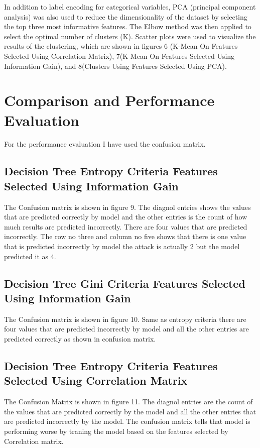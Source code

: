 \documentclass{article}
\begin{document}
In addition to label encoding for categorical variables, PCA (principal component analysis) was also used to reduce the dimensionality of the dataset by selecting the top three most informative features. The Elbow method was then applied to select the optimal number of clusters (K). Scatter plots were used to visualize the results of the clustering, which are shown in figures 6 (K-Mean On Features Selected Using Correlation Matrix), 7(K-Mean On Features Selected Using Information Gain), and 8(Clusters Using Features Selected Using PCA).



\section{Comparison and Performance Evaluation}
For the performance evaluation I have used the confusion matrix.

\subsection{Decision Tree Entropy Criteria Features Selected Using Information Gain}
The Confusion matrix is shown in figure 9. The diagnol entries shows the values that are predicted correctly by model and the other entries is the count of how much results are predicted incorrectly. There are four values that are predicted incorrectly. The row no three and column no five shows that there is one value that is predicted incorrectly by model the attack is actually 2 but the model predicted it as 4. 

\subsection{Decision Tree Gini Criteria Features Selected Using Information Gain}
The Confusion matrix is shown in figure 10. Same as entropy criteria there are four values that are predicted incorrectly by model and all the other entries are predicted correctly as shown in confusion matrix.


\subsection{Decision Tree Entropy Criteria Features Selected Using Correlation Matrix}
The Confusion Matrix is shown in figure 11. The diagnol entries are the count of the values that are predicted correctly by the model and all the other entries that are predicted incorrectly by the model. The confusion matrix tells that model is performing worse by traning the model based on the features selected by Correlation matrix. 
\end{document}
